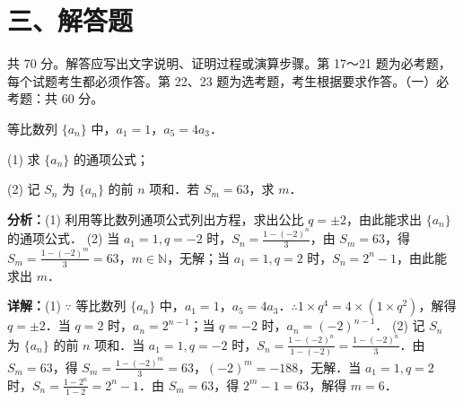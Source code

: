 \section*{三、解答题}
共 70 分。解答应写出文字说明、证明过程或演算步骤。第 17～21 题为必考题，每个试题考生都必须作答。第 22、23 题为选考题，考生根据要求作答。（一）必考题：共 60 分。

\begin{question}[points=12]
等比数列 $\{a_n\}$ 中，$a_1=1$，$a_5=4a_3$．

(1) 求 $\{a_n\}$ 的通项公式；

(2) 记 $S_n$ 为 $\{a_n\}$ 的前 $n$ 项和．若 $S_m=63$，求 $m$．
\begin{solution}

\textbf{分析：}(1) 利用等比数列通项公式列出方程，求出公比 $q=\pm2$，由此能求出 $\{a_n\}$ 的通项公式．
(2) 当 $a_1=1,q=-2$ 时，$S_n=\frac{1-(-2)^n}{3}$，由 $S_m=63$，得 $S_m=\frac{1-(-2)^m}{3}=63$，$m\in\mathbb{N}$，无解；当 $a_1=1,q=2$ 时，$S_n=2^n-1$，由此能求出 $m$．

\textbf{详解：}(1) $\because$ 等比数列 $\{a_n\}$ 中，$a_1=1$，$a_5=4a_3$．$\therefore 1\times q^4=4\times (1\times q^2)$，解得 $q=\pm2$．当 $q=2$ 时，$a_n=2^{n-1}$；当 $q=-2$ 时，$a_n=(-2)^{n-1}$．
(2) 记 $S_n$ 为 $\{a_n\}$ 的前 $n$ 项和．当 $a_1=1,q=-2$ 时，$S_n=\frac{1-(-2)^n}{1-(-2)}=\frac{1-(-2)^n}{3}$．由 $S_m=63$，得 $S_m=\frac{1-(-2)^m}{3}=63$，$(-2)^m=-188$，无解．当 $a_1=1,q=2$ 时，$S_n=\frac{1-2^n}{1-2}=2^n-1$．由 $S_m=63$，得 $2^m-1=63$，解得 $m=6$．
\end{solution}
\end{question}

